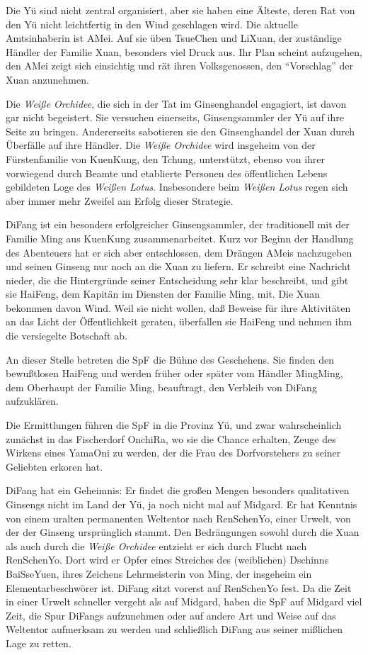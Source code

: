 \documentclass[
a4paper,
twoside,
DIV=calc,
BCOR=4mm,
fontsize=9pt,
twocolumn=on,
titlepage=on,
parskip=half
]{scrartcl}
\begin{document}
Die Yü sind nicht zentral organisiert, aber sie haben eine Älteste,
deren Rat von den Yü nicht leichtfertig in den Wind geschlagen
wird. Die aktuelle Amtsinhaberin ist AMei. Auf sie üben TsueChen und
LiXuan, der zuständige Händler der Familie Xuan, besonders viel
Druck aus. Ihr Plan scheint aufzugehen, den AMei zeigt sich einsichtig
und rät ihren Volksgenossen, den "`Vorschlag"' der Xuan anzunehmen.

Die \emph{Weiße Orchidee}, die sich in der Tat im Ginsenghandel
engagiert, ist davon gar nicht begeistert. Sie versuchen einerseits,
Ginsengsammler der Yü auf ihre Seite zu bringen. Andererseits
sabotieren sie den Ginsenghandel der Xuan durch Überfälle auf ihre
Händler. Die \emph{Weiße Orchidee} wird insgeheim von der
Fürstenfamilie von KuenKung, den Tchung, unterstützt, ebenso von ihrer
vorwiegend durch Beamte und etablierte Personen des öffentlichen
Lebens gebildeten Loge des \emph{Weißen Lotus}. Insbesondere beim
\emph{Weißen Lotus} regen sich aber immer mehr Zweifel am Erfolg
dieser Strategie.

DiFang ist ein besonders erfolgreicher Ginsengsammler, der
traditionell mit der Familie Ming aus KuenKung zusammenarbeitet. Kurz
vor Beginn der Handlung des Abenteuers hat er sich aber entschlossen,
dem Drängen AMeis nachzugeben und seinen Ginseng nur noch an die Xuan
zu liefern. Er schreibt eine Nachricht nieder, die die Hintergründe
seiner Entscheidung sehr klar beschreibt, und gibt sie HaiFeng, dem
Kapitän im Diensten der Familie Ming, mit. Die Xuan bekommen davon
Wind. Weil sie nicht wollen, daß Beweise für ihre Aktivitäten an das
Licht der Öffentlichkeit geraten, überfallen sie HaiFeng und nehmen
ihm die versiegelte Botschaft ab.

An dieser Stelle betreten die SpF die Bühne des Geschehens. Sie finden
den bewußtlosen HaiFeng und werden früher oder später vom Händler
MingMing, dem Oberhaupt der Familie Ming, beauftragt, den Verbleib von
DiFang aufzuklären.

Die Ermittlungen führen die SpF in die Provinz Yü, und zwar
wahrscheinlich zunächst in das Fischerdorf OnchiRa, wo sie die Chance
erhalten, Zeuge des Wirkens eines YamaOni zu werden, der die Frau des
Dorfvorstehers zu seiner Geliebten erkoren hat.

DiFang hat ein Geheimnis: Er findet die großen Mengen besonders
qualitativen Ginsengs nicht im Land der Yü, ja noch nicht mal auf
Midgard. Er hat Kenntnis von einem uralten permanenten Weltentor nach
RenSchenYo, einer Urwelt, von der der Ginseng ursprünglich stammt. Den
Bedrängungen sowohl durch die Xuan als auch durch die \emph{Weiße
  Orchidee} entzieht er sich durch Flucht nach RenSchenYo. Dort wird
er Opfer eines Streiches des (weiblichen) Dschinns BaiSseYuen, ihres
Zeichens Lehrmeisterin von Ming, der insgeheim ein Elementarbeschwörer
ist. DiFang sitzt vorerst auf RenSchenYo fest. Da die Zeit in einer
Urwelt schneller vergeht als auf Midgard, haben die SpF auf Midgard
viel Zeit, die Spur DiFangs aufzunehmen oder auf andere Art und Weise
auf das Weltentor aufmerksam zu werden und schließlich DiFang aus
seiner mißlichen Lage zu retten.
\end{document}

